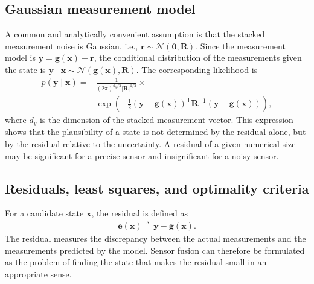 \subsection{Gaussian measurement model}
A common and analytically convenient assumption is that the stacked measurement noise is Gaussian, i.e., $\mathbf{r} \sim \mathcal{N} \left( \mathbf{0}, \mathbf{R} \right)$. Since the measurement model is $\mathbf{y}=\mathbf{g}(\mathbf{x})+\mathbf{r}$, the conditional distribution of the measurements given the state is $\mathbf{y}\mid\mathbf{x} \sim \mathcal{N} \left( \mathbf{g}(\mathbf{x}), \mathbf{R} \right)$. 
The corresponding likelihood is
\begin{align}
\label{eq:Gaussianlikelihood}
p(\mathbf{y}\mid\mathbf{x}) =& \frac{1} {(2\pi)^{d_y/2}|\mathbf{R}|^{1/2}}\times  \\ 
&\exp \left( - \frac{1}{2} \left( \mathbf{y}-\mathbf{g}(\mathbf{x})\right)^{\mathsf T}\mathbf{R}^{-1}\left(\mathbf{y}-\mathbf{g}(\mathbf{x})\right)\right), \nonumber
\end{align}
where $d_y$ is the dimension of the stacked measurement vector. This expression shows that the plausibility of a state is not determined by the residual alone, but by the residual relative to the uncertainty. A residual of a given numerical size may be significant for a precise sensor and insignificant for a noisy sensor.

\subsection{Residuals, least squares, and optimality criteria}
For a candidate state $\mathbf{x}$, the residual is defined as
\begin{align}
\mathbf{e}(\mathbf{x}) \triangleq \mathbf{y} - \mathbf{g}(\mathbf{x}).
\end{align}
The residual measures the discrepancy between the actual measurements and the measurements predicted by the model. Sensor fusion can therefore be formulated as the problem of finding the state that makes the residual small in an appropriate sense.

